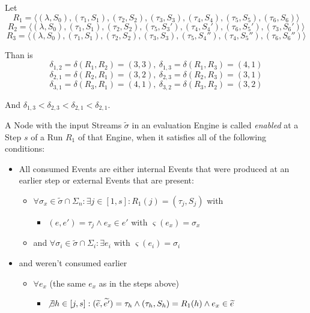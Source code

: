 \begin{exmp}
  Let
  \[R_1 = \langle (\lambda, S_0), (\tau_1,S_1), (\tau_2,S_2), (\tau_3,S_3), (\tau_4,S_4), (\tau_5,S_5), (\tau_6,S_6) \rangle\]
  \[R_2 = \langle (\lambda, S_0), (\tau_1,S_1), (\tau_2,S_2), (\tau_5,S_3'), (\tau_4,S_4'), (\tau_6,S_5'), (\tau_3,S_6') \rangle\]
  \[R_3 = \langle (\lambda, S_0), (\tau_1,S_1), (\tau_2,S_2), (\tau_3,S_3), (\tau_5,S_4''), (\tau_4,S_5''), (\tau_6,S_6'') \rangle\]

  Than is
  \[\delta_{1,2} = \delta(R_1,R_2) = (3,3),\ \delta_{1,3} = \delta(R_1,R_3) = (4,1)\]
  \[\delta_{2,1} = \delta(R_2,R_1) = (3,2),\ \delta_{2,3} = \delta(R_2,R_3) = (3,1)\]
  \[\delta_{3,1} = \delta(R_3,R_1) = (4,1),\ \delta_{3,2} = \delta(R_3,R_2) = (3,2)\]

  And \(\delta_{1,3} < \delta_{2,3} < \delta_{2,1} < \delta_{2,1}\).


\end{exmp}

\begin{definition}[name = Enabledness of a Node]\label{def:node_enabled}
  A Node with the input Streams \(\widetilde{\sigma}\) in an evaluation Engine is called \emph{enabled} at a Step \(s\) of a Run \(R_1\) of that Engine, when it satisfies all of the following conditions:

  \begin{itemize}
    \item All consumed Events are either internal Events that were produced at an earlier step or external Events that are present:
      \begin{itemize}
        \item \(\forall \sigma_x \in \widetilde{\sigma} \cap \Sigma_n: \exists j \in [1, s]: R_1(j) = (\tau_j, S_j)\) with
          \begin{itemize}
            \item\( (e, e') = \tau_j \land e_x \in e'\) with \(\varsigma(e_x) = \sigma_x \)
          \end{itemize}
        \item and \(\forall \sigma_i \in \widetilde{\sigma} \cap\Sigma_i:\exists e_i\) with \(\varsigma(e_i) = \sigma_i\)
      \end{itemize}
    \item and weren't consumed earlier
      \begin{itemize}
        \item \(\forall e_x\) (the same \(e_x\) as in the steps above)
          \begin{itemize}
            \item \(\not\exists h \in [j, s]: (\widetilde{e}, \widetilde{e'}) = \tau_h \land (\tau_h, S_h) = R_1(h) \land e_x \in \widetilde{e}\)
          \end{itemize}
      \end{itemize}
  \end{itemize}
\end{definition}

